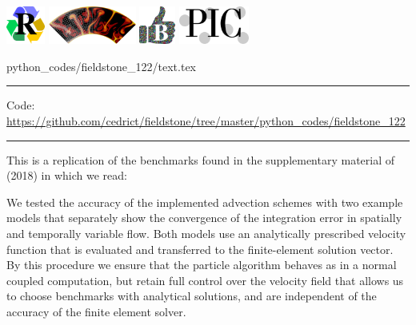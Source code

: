 \noindent
\includegraphics[height=1.25cm]{images/pictograms/replication}
\includegraphics[height=1.25cm]{images/pictograms/aspect_logo}
\includegraphics[height=1.25cm]{images/pictograms/benchmark}
\includegraphics[height=1.25cm]{images/pictograms/pic}


\begin{flushright} {\tiny {\color{gray} python\_codes/fieldstone\_122/text.tex}} \end{flushright}

%

\par\noindent\rule{\textwidth}{0.4pt}

\begin{center}
\inpython
{\small Code: \url{https://github.com/cedrict/fieldstone/tree/master/python_codes/fieldstone_122}}
\end{center}

\par\noindent\rule{\textwidth}{0.4pt}


This \stone is a replication of the benchmarks found in the supplementary material 
of \textcite{galh18} (2018) in which we read:  

\begin{displayquote}
{\color{darkgray}
We tested the accuracy of the implemented advection
schemes with two example models that separately show the
convergence of the integration error in spatially and temporally 
variable flow. Both models use an analytically prescribed 
velocity function that is evaluated and transferred
to the finite-element solution vector. By this procedure we
ensure that the particle algorithm behaves as in a normal
coupled computation, but retain full control over the velocity 
field that allows us to choose benchmarks with analytical
solutions, and are independent of the accuracy of the finite
element solver.
}
\end{displayquote}

